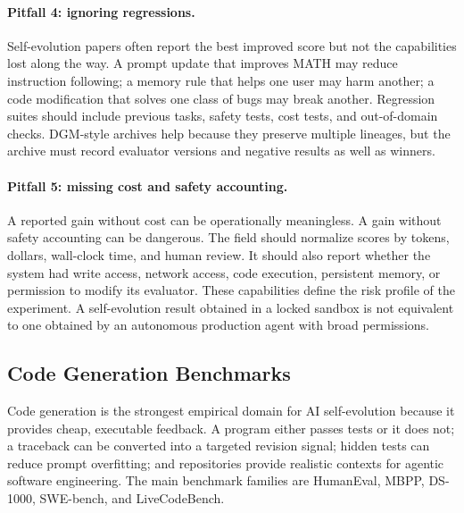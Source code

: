 \paragraph{Pitfall 4: ignoring regressions.}
Self-evolution papers often report the best improved score but not the capabilities lost along the way. A prompt update that improves MATH may reduce instruction following; a memory rule that helps one user may harm another; a code modification that solves one class of bugs may break another. Regression suites should include previous tasks, safety tests, cost tests, and out-of-domain checks. DGM-style archives help because they preserve multiple lineages, but the archive must record evaluator versions and negative results as well as winners.

\paragraph{Pitfall 5: missing cost and safety accounting.}
A reported gain without cost can be operationally meaningless. A gain without safety accounting can be dangerous. The field should normalize scores by tokens, dollars, wall-clock time, and human review. It should also report whether the system had write access, network access, code execution, persistent memory, or permission to modify its evaluator. These capabilities define the risk profile of the experiment. A self-evolution result obtained in a locked sandbox is not equivalent to one obtained by an autonomous production agent with broad permissions.

\subsection{Code Generation Benchmarks}
\label{subsec:code-generation-benchmarks}

Code generation is the strongest empirical domain for AI self-evolution because it provides cheap, executable feedback. A program either passes tests or it does not; a traceback can be converted into a targeted revision signal; hidden tests can reduce prompt overfitting; and repositories provide realistic contexts for agentic software engineering. The main benchmark families are HumanEval, MBPP, DS-1000, SWE-bench, and LiveCodeBench.


